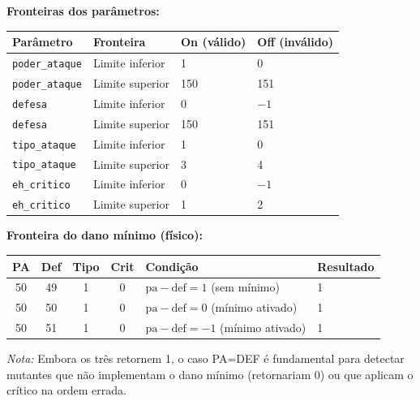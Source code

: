 \documentclass[12pt,a4paper]{article}
\begin{document}
\begin{tcolorbox}[colback=red!5, colframe=red!40, title=\textbf{Análise do Valor Limite}, fonttitle=\small]

\textbf{Fronteiras dos parâmetros:}

\begin{center}
\begin{tabular}{llll}
\toprule
\textbf{Parâmetro} & \textbf{Fronteira} & \textbf{On (válido)} & \textbf{Off (inválido)} \\
\midrule
\texttt{poder\_ataque} & Limite inferior & 1 & 0 \\
\texttt{poder\_ataque} & Limite superior & 150 & 151 \\
\texttt{defesa} & Limite inferior & 0 & $-1$ \\
\texttt{defesa} & Limite superior & 150 & 151 \\
\texttt{tipo\_ataque} & Limite inferior & 1 & 0 \\
\texttt{tipo\_ataque} & Limite superior & 3 & 4 \\
\texttt{eh\_critico} & Limite inferior & 0 & $-1$ \\
\texttt{eh\_critico} & Limite superior & 1 & 2 \\
\bottomrule
\end{tabular}
\end{center}

\vspace{0.15in}
\textbf{Fronteira do dano mínimo (físico):}

\begin{center}
\begin{tabular}{ccccll}
\toprule
\textbf{PA} & \textbf{Def} & \textbf{Tipo} & \textbf{Crit} & \textbf{Condição} & \textbf{Resultado} \\
\midrule
50 & 49 & 1 & 0 & $\text{pa} - \text{def} = 1$ (sem mínimo) & 1 \\
50 & 50 & 1 & 0 & $\text{pa} - \text{def} = 0$ (mínimo ativado) & 1 \\
50 & 51 & 1 & 0 & $\text{pa} - \text{def} = -1$ (mínimo ativado) & 1 \\
\bottomrule
\end{tabular}
\end{center}

\textit{Nota:} Embora os três retornem 1, o caso PA=DEF é fundamental para detectar mutantes que não implementam o dano mínimo (retornariam 0) ou que aplicam o crítico na ordem errada.

\end{tcolorbox}
\end{document}

